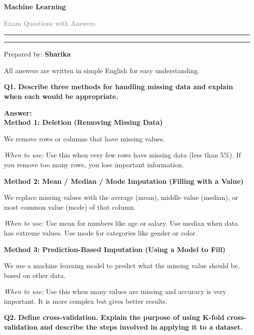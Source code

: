 \documentclass[12pt,a4paper]{article}
\newcommand{\question}[2]{%
    \begin{mdframed}[style=questionstyle]
        \textbf{\textcolor{headerblue}{Q#1.}} \textbf{#2}
    \end{mdframed}%
    \vspace{2pt}%
}
\newcommand{\ans}{\textbf{\textcolor{headerblue}{Answer:}}\\[4pt]}
\newcommand{\subhead}[1]{\textbf{\textcolor{headerblue}{#1}}}
\begin{document}
\begin{titlepage}
    \centering
    \vspace*{2cm}
    {\Huge\bfseries\textcolor{headerblue}{Machine Learning}\par}
    \vspace{0.5cm}
    {\LARGE\textcolor{gray}{Exam Questions with Answers}\par}
    \vspace{1.5cm}
    \rule{\textwidth}{1.5pt}
    \vspace{0.3cm}
    \rule{\textwidth}{0.5pt}
    \vspace{2cm}
    {\large Prepared by: \textbf{Sharika}\par}
    \vfill
    {\small All answers are written in simple English for easy understanding.}
\end{titlepage}

\setlength{\parskip}{6pt}

\question{1}{Describe three methods for handling missing data and explain when each would be appropriate.}

\ans

\subhead{Method 1: Deletion (Removing Missing Data)}

We remove rows or columns that have missing values.

\textit{When to use:} Use this when very few rows have missing data (less than 5\%). If you remove too many rows, you lose important information.

\subhead{Method 2: Mean / Median / Mode Imputation (Filling with a Value)}

We replace missing values with the average (mean), middle value (median), or most common value (mode) of that column.

\textit{When to use:} Use mean for numbers like age or salary. Use median when data has extreme values. Use mode for categories like gender or color.

\subhead{Method 3: Prediction-Based Imputation (Using a Model to Fill)}

We use a machine learning model to predict what the missing value should be, based on other data.

\textit{When to use:} Use this when many values are missing and accuracy is very important. It is more complex but gives better results.

\vspace{10pt}
\question{2}{Define cross-validation. Explain the purpose of using K-fold cross-validation and describe the steps involved in applying it to a dataset.}
\end{document}
